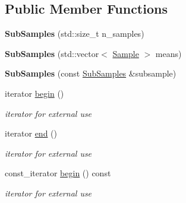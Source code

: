 \subsection*{Public Member Functions}
\begin{DoxyCompactItemize}
\item 
\mbox{\label{classQn_1_1SubSamples_a3a5d53772d9fe8c1dfbf95082a1f4ffa}} 
{\bfseries Sub\+Samples} (std\+::size\+\_\+t n\+\_\+samples)
\item 
\mbox{\label{classQn_1_1SubSamples_a23f9a0693bf80925f8a097eb1ac9edb1}} 
{\bfseries Sub\+Samples} (std\+::vector$<$ \mbox{\hyperlink{structQn_1_1Sample}{Sample}} $>$ means)
\item 
\mbox{\label{classQn_1_1SubSamples_a18d4b903304bad27794b589d1f0a576d}} 
{\bfseries Sub\+Samples} (const \mbox{\hyperlink{classQn_1_1SubSamples}{Sub\+Samples}} \&subsample)
\item 
\mbox{\label{classQn_1_1SubSamples_ab1d5ad8971a95148f4ace2d1eff63402}} 
iterator \mbox{\hyperlink{classQn_1_1SubSamples_ab1d5ad8971a95148f4ace2d1eff63402}{begin}} ()
\begin{DoxyCompactList}\small\item\em iterator for external use \end{DoxyCompactList}\item 
\mbox{\label{classQn_1_1SubSamples_a7a3a10d4d32b9258268981880dd8acd2}} 
iterator \mbox{\hyperlink{classQn_1_1SubSamples_a7a3a10d4d32b9258268981880dd8acd2}{end}} ()
\begin{DoxyCompactList}\small\item\em iterator for external use \end{DoxyCompactList}\item 
\mbox{\label{classQn_1_1SubSamples_a6c5bda7d51557ee41d8171e7f78f3bab}} 
const\+\_\+iterator \mbox{\hyperlink{classQn_1_1SubSamples_a6c5bda7d51557ee41d8171e7f78f3bab}{begin}} () const
\begin{DoxyCompactList}\small\item\em iterator for external use \end{DoxyCompactList}\item 

\end{DoxyCompactItemize}
